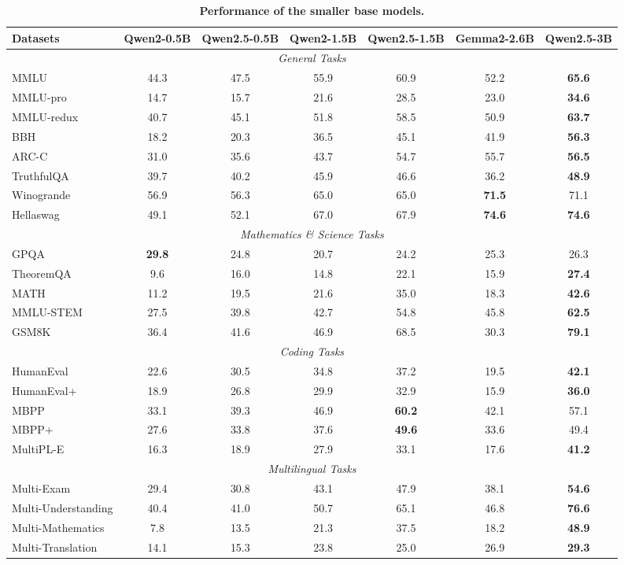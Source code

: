 \documentclass{article}
\begin{document}
\begin{table}[t]
\centering
\caption{\textbf{Performance of the smaller base models.}}
\label{tab:base-small}
\small 
\setlength{\tabcolsep}{3pt} 
\renewcommand{\arraystretch}{0.9} 
\begin{tabular}{@{}lcccccc@{}}
\toprule
\textbf{Datasets} & \textbf{Qwen2-0.5B} & \textbf{Qwen2.5-0.5B} & \textbf{Qwen2-1.5B} & \textbf{Qwen2.5-1.5B} & \textbf{Gemma2-2.6B} & \textbf{Qwen2.5-3B} \\
\midrule
\multicolumn{7}{c}{\textit{General Tasks}} \\
\midrule
MMLU & 44.3 & 47.5 & 55.9 & 60.9 & 52.2 & \textbf{65.6} \\
MMLU-pro & 14.7 & 15.7 & 21.6 & 28.5 & 23.0 & \textbf{34.6} \\
MMLU-redux & 40.7 & 45.1 & 51.8 & 58.5 & 50.9 & \textbf{63.7} \\
BBH & 18.2 & 20.3 & 36.5 & 45.1 & 41.9 & \textbf{56.3} \\
ARC-C & 31.0 & 35.6 & 43.7 & 54.7 & 55.7 & \textbf{56.5} \\
TruthfulQA & 39.7 & 40.2 & 45.9 & 46.6 & 36.2 & \textbf{48.9} \\
Winogrande & 56.9 & 56.3 & 65.0 & 65.0 & \textbf{71.5} & 71.1 \\
Hellaswag & 49.1 & 52.1 & 67.0 & 67.9 & \textbf{74.6} & \textbf{74.6} \\
\midrule
\multicolumn{7}{c}{\textit{Mathematics \& Science Tasks}} \\
\midrule
GPQA & \textbf{29.8} & 24.8 & 20.7 & 24.2 & 25.3 & 26.3 \\
TheoremQA & 9.6 & 16.0 & 14.8 & 22.1 & 15.9 & \textbf{27.4} \\
MATH & 11.2 & 19.5 & 21.6 & 35.0 & 18.3 & \textbf{42.6} \\
MMLU-STEM & 27.5 & 39.8 & 42.7 & 54.8 & 45.8 & \textbf{62.5} \\
GSM8K & 36.4 & 41.6 & 46.9 & 68.5 & 30.3 & \textbf{79.1} \\
\midrule
\multicolumn{7}{c}{\textit{Coding Tasks}} \\
\midrule
HumanEval & 22.6 & 30.5 & 34.8 & 37.2 & 19.5 & \textbf{42.1} \\
HumanEval+ & 18.9 & 26.8 & 29.9 & 32.9 & 15.9 & \textbf{36.0} \\
MBPP & 33.1 & 39.3 & 46.9 & \textbf{60.2} & 42.1 & 57.1 \\
MBPP+ & 27.6 & 33.8 & 37.6 & \textbf{49.6} & 33.6 & 49.4 \\
MultiPL-E & 16.3 & 18.9 & 27.9 & 33.1 & 17.6 & \textbf{41.2} \\
\midrule
\multicolumn{7}{c}{\textit{Multilingual Tasks}} \\
\midrule
Multi-Exam & 29.4 & 30.8 & 43.1 & 47.9 & 38.1 & \textbf{54.6} \\
Multi-Understanding & 40.4 & 41.0 & 50.7 & 65.1 & 46.8 & \textbf{76.6} \\
Multi-Mathematics & 7.8 & 13.5 & 21.3 & 37.5 & 18.2 & \textbf{48.9} \\
Multi-Translation & 14.1 & 15.3 & 23.8 & 25.0 & 26.9 & \textbf{29.3} \\
\bottomrule
\end{tabular}
\end{table}
\end{document}
